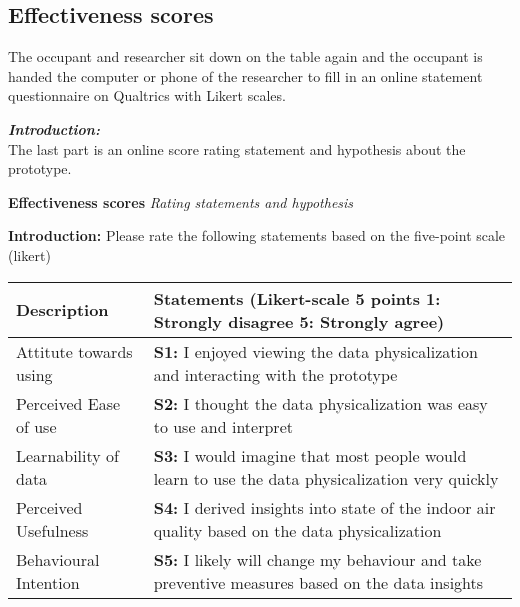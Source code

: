\begin{appendices}
\section{Effectiveness scores}
\label{appendix:effectiveness}

The occupant and researcher sit down on the table again and the occupant is handed the computer or phone of the researcher to fill in an online statement questionnaire on Qualtrics with Likert scales. \\

\raggedright \textit{\textbf{Introduction:}} \\ The last part is an online score rating statement and hypothesis about the prototype. 

\vspace{5pt}

\begin{table}[htbp]
    \captionsetup{justification=raggedright,singlelinecheck=false}
    \raggedright \textbf{Effectiveness scores} \textit{Rating statements and hypothesis} \\
    \label{tab:column_widths}
    \raggedright \textbf{Introduction:} Please rate the following statements based on the five-point scale (likert)
    \begin{tabularx}{\textwidth}{|p{}|X|}
        \hline
        \textbf{Description} & \textbf{Statements (Likert-scale 5 points 1: Strongly disagree 5: Strongly agree)} \\
        \hline        
        \hline
        Attitute towards using & \textbf{S1:} I enjoyed viewing the data physicalization and interacting with the prototype \\
        \hline
        Perceived Ease of use & \textbf{S2:} I thought the data physicalization was easy to use and interpret \\
        \hline
        Learnability of data & \textbf{S3:} I would imagine that most people would learn to use the data physicalization very quickly \\
        \hline
        Perceived Usefulness & \textbf{S4:} I derived insights into state of the indoor air quality based on the data physicalization \\
        \hline
        Behavioural Intention & \textbf{S5:} I likely will change my behaviour and take preventive measures based on the data insights \\        
        \hline
    \end{tabularx}
\end{table}


\end{appendices}
